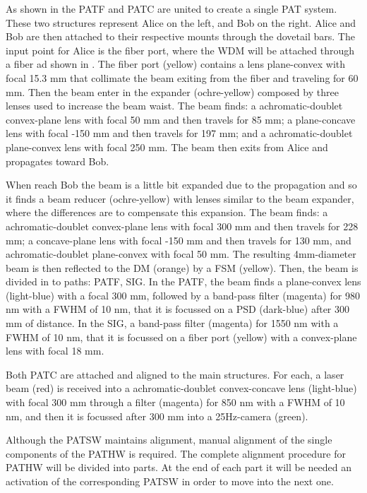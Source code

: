 
As shown in the  PATF and PATC are united to create a single PAT system. These two structures represent Alice on the left, and Bob on the right. Alice and Bob are then attached to their respective mounts through the dovetail bars.
The input point for Alice is the fiber port, where the WDM will be attached through a fiber ad shown in . The fiber port (yellow) contains a lens plane-convex with focal 15.3 mm that collimate the beam exiting from the fiber and traveling for 60 mm. Then the beam enter in the expander (ochre-yellow) composed by three lenses used to increase the beam waist. The beam finds: a achromatic-doublet convex-plane lens with focal 50 mm and then travels for 85 mm; a plane-concave lens with focal -150 mm and then travels for 197 mm; and a achromatic-doublet plane-convex lens with focal 250 mm. The beam then exits from Alice and propagates toward Bob.

When reach Bob the beam is a little bit expanded due to the propagation and so it finds a beam reducer (ochre-yellow) with lenses similar to the beam expander, where the differences are to compensate this expansion. The beam finds: a achromatic-doublet convex-plane lens with focal 300 mm and then travels for 228 mm; a concave-plane lens with focal -150 mm and then travels for 130 mm, and achromatic-doublet plane-convex with focal 50 mm. The resulting 4mm-diameter beam is then reflected to the DM (orange) by a FSM (yellow). Then, the beam is divided in to paths: PATF, SIG.
In the PATF, the beam finds a plane-convex lens (light-blue) with a focal 300 mm, followed by a band-pass filter (magenta) for 980 nm with a FWHM of 10 nm, that it is focussed on a PSD (dark-blue) after 300 mm of distance.
In the SIG, a band-pass filter (magenta) for 1550 nm with a FWHM of 10 nm, that it is focussed on a fiber port (yellow) with a convex-plane lens with focal 18 mm.

Both PATC are attached and aligned to the main structures. For each, a laser beam (red) is received into a achromatic-doublet convex-concave lens (light-blue) with focal 300 mm through a filter (magenta) for 850 nm with a FWHM of 10 nm, and then it is focussed after 300 mm into a 25Hz-camera (green).

Although the PATSW maintains alignment, manual alignment of the single components of the PATHW is required.
The complete alignment procedure for PATHW will be divided into parts. At the end of each part it will be needed an activation of the corresponding PATSW in order to move into the next one.

